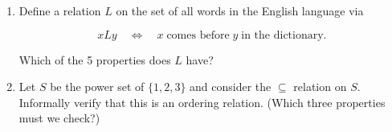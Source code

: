 \documentclass{amsart}
\begin{document}
\begin{enumerate}
\vfill

\newpage

\item Define a relation $L$ on the set of all words in the English language via

\[ xLy \quad \iff \quad x \; \mbox{comes before} \; y \; \mbox{in the dictionary}. \]

Which of the 5 properties does $L$ have?

\vfill

\item Let $S$ be the power set of $\{1, 2, 3 \}$ and consider the $\subseteq$ relation on $S$.  Informally verify that this is an ordering relation.  (Which three properties must we check?)


\vfill

\end{enumerate}
\end{document}
